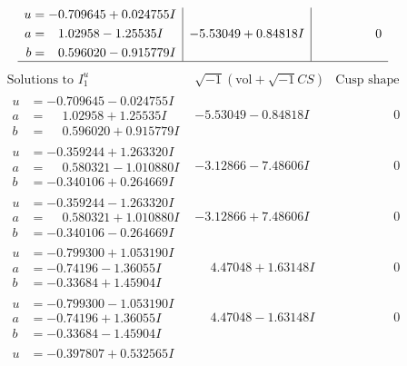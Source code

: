 \documentclass[1p]{elsarticle_modified}
\theoremstyle{definition}
\newcommand{\I}{\sqrt{-1}}
\begin{document}
$$\begin{array}{c|c|c}
\begin{aligned}
u &= -0.709645 + 0.024755 I \\
a &= \phantom{-}1.02958 - 1.25535 I \\
b &= \phantom{-}0.596020 - 0.915779 I\end{aligned}
 & -5.53049 + 0.84818 I & \phantom{-0.000000 } 0\\
 \hline 
 \end{array}$$\newpage$$\begin{array}{c|c|c}  
\text{Solutions to }I^u_{1}& \I (\text{vol} + \sqrt{-1}CS) & \text{Cusp shape}\\
 \hline 
\begin{aligned}
u &= -0.709645 - 0.024755 I \\
a &= \phantom{-}1.02958 + 1.25535 I \\
b &= \phantom{-}0.596020 + 0.915779 I\end{aligned}
 & -5.53049 - 0.84818 I & \phantom{-0.000000 } 0 \\ \hline\begin{aligned}
u &= -0.359244 + 1.263320 I \\
a &= \phantom{-}0.580321 - 1.010880 I \\
b &= -0.340106 + 0.264669 I\end{aligned}
 & -3.12866 - 7.48606 I & \phantom{-0.000000 } 0 \\ \hline\begin{aligned}
u &= -0.359244 - 1.263320 I \\
a &= \phantom{-}0.580321 + 1.010880 I \\
b &= -0.340106 - 0.264669 I\end{aligned}
 & -3.12866 + 7.48606 I & \phantom{-0.000000 } 0 \\ \hline\begin{aligned}
u &= -0.799300 + 1.053190 I \\
a &= -0.74196 - 1.36055 I \\
b &= -0.33684 + 1.45904 I\end{aligned}
 & \phantom{-}4.47048 + 1.63148 I & \phantom{-0.000000 } 0 \\ \hline\begin{aligned}
u &= -0.799300 - 1.053190 I \\
a &= -0.74196 + 1.36055 I \\
b &= -0.33684 - 1.45904 I\end{aligned}
 & \phantom{-}4.47048 - 1.63148 I & \phantom{-0.000000 } 0 \\ \hline\begin{aligned}
u &= -0.397807 + 0.532565 I \\

\end{aligned}
\end{array}$$
\end{document}
